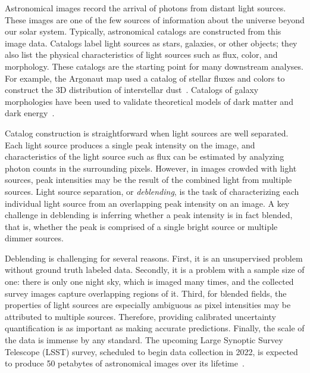 Astronomical images record the arrival of photons from distant light sources. 
These images are one of the few sources of information about the universe beyond our solar system.
Typically, astronomical catalogs are constructed from this image data.
Catalogs label light sources as stars, galaxies, or other objects; 
they also list the physical characteristics of light sources such as flux, color, and morphology. 
These catalogs are the starting point for many downstream analyses.
For example, the Argonaut map used a catalog of stellar fluxes and colors to construct the 3D distribution of interstellar dust~\cite{Green_2019_argonaut}. 
Catalogs of galaxy morphologies have been used to validate theoretical models of dark matter and dark energy~\cite{Eisenstein_2005_darkmatter}. 

Catalog construction is straightforward when light sources are well separated. Each light source produces a single peak intensity on the image, and characteristics of the light source such as flux can be estimated by analyzing photon counts in the surrounding pixels. 
However, in images crowded with light sources, peak intensities may be the result of the combined light from multiple sources.
Light source separation, or {\itshape deblending}, is the task of characterizing each individual light source from an overlapping peak intensity on an image. 
A key challenge in deblending is inferring whether a peak intensity is in fact blended, that is, whether the peak is comprised of a single bright source or multiple dimmer sources. 


Deblending is challenging for several reasons.
First, it is an unsupervised problem without ground truth labeled data. 
Secondly, it is a problem with a sample size of one: there is only one night sky, which is imaged many times, and the collected survey images capture overlapping regions of it.
Third, for blended fields, the properties of light sources are especially ambiguous as pixel intensities may be attributed to multiple sources. Therefore, providing calibrated uncertainty quantification is as important as making accurate predictions.
Finally, the scale of the data is immense by any standard. The upcoming Large Synoptic Survey Telescope (LSST) survey, scheduled to begin data collection in 2022, is expected to produce 50 petabytes of astronomical images over its lifetime~\cite{LSST_about}.

